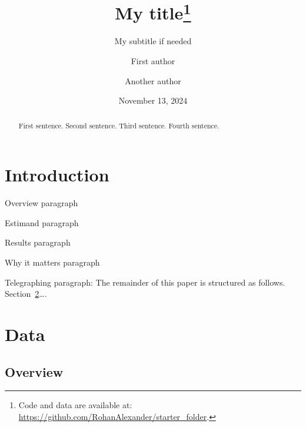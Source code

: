 \documentclass[
  letterpaper,
  DIV=11,
  numbers=noendperiod]{scrartcl}
\title{My title\thanks{Code and data are available at:
\url{https://github.com/RohanAlexander/starter_folder}.}}
\subtitle{My subtitle if needed}
\author{First author \and Another author}
\date{November 13, 2024}
\begin{document}
\maketitle
\begin{abstract}
First sentence. Second sentence. Third sentence. Fourth sentence.
\end{abstract}


\section{Introduction}\label{introduction}

Overview paragraph

Estimand paragraph

Results paragraph

Why it matters paragraph

Telegraphing paragraph: The remainder of this paper is structured as
follows. Section~\ref{sec-data}\ldots.

\section{Data}\label{sec-data}

\subsection{Overview}\label{overview}
\end{document}
